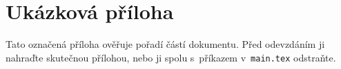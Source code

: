 \chapter{Ukázková příloha}
\label{app:example}

Tato označená příloha ověřuje pořadí částí dokumentu. Před odevzdáním ji
nahraďte skutečnou přílohou, nebo ji spolu s~příkazem v~\texttt{main.tex}
odstraňte.
